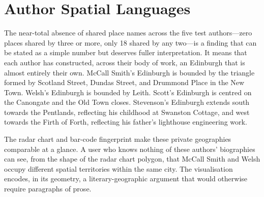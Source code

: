 \documentclass[logo,msc]{infthesis}
\begin{document}
\section{Author Spatial Languages}
 
The near-total absence of shared place names across the five test authors---zero places shared by three or more, only 18 shared by any two---is a finding that can be stated as a simple number but deserves fuller interpretation. It means that each author has constructed, across their body of work, an Edinburgh that is almost entirely their own. McCall Smith's Edinburgh is bounded by the triangle formed by Scotland Street, Dundas Street, and Drummond Place in the New Town. Welsh's Edinburgh is bounded by Leith. Scott's Edinburgh is centred on the Canongate and the Old Town closes. Stevenson's Edinburgh extends south towards the Pentlands, reflecting his childhood at Swanston Cottage, and west towards the Firth of Forth, reflecting his father's lighthouse engineering work.
 
The radar chart and bar-code fingerprint make these private geographies comparable at a glance. A user who knows nothing of these authors' biographies can see, from the shape of the radar chart polygon, that McCall Smith and Welsh occupy different spatial territories within the same city. The visualisation encodes, in its geometry, a literary-geographic argument that would otherwise require paragraphs of prose.
\end{document}
